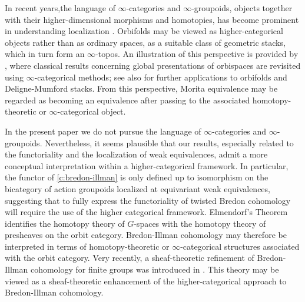 \documentclass[12pt,reqno]{amsart}
\theoremstyle{plain}
\theoremstyle{definition}
\begin{document}
In recent years,the language of $\infty$-categories and $\infty$-groupoids, objects together with their higher-dimensional morphisms and homotopies, has become prominent  in understanding localization \cite{lurie}.  Orbifolds may be  viewed as higher-categorical objects rather than as ordinary spaces, as a suitable class of geometric stacks, which in turn form an $\infty$-topos.     An illustration of this perspective is provided by \cite{dai}, where classical results concerning global presentations of orbispaces are revisited using $\infty$-categorical methods;  see also \cite{carchedi} for further applications to orbifolds and Deligne-Mumford stacks.
From this perspective, Morita equivalence may be regarded as becoming an equivalence after passing to the associated homotopy-theoretic or $\infty$-categorical object.  



In the present paper we do not pursue the language of $\infty$-categories and $\infty$-groupoids.  Nevertheless, it seems plausible that our results, especially related to the functoriality and the localization of weak equivalences, admit a more conceptual interpretation within a higher-categorical framework. In particular, the functor of \cref{c:bredon-illman} is only defined up to isomorphism on the bicategory of action groupoids localized at equivariant weak equivalences, suggesting that to fully express the functoriality of twisted Bredon cohomology will require the use of the higher categorical framework.
Elmendorf’s Theorem \cite{elmendorf} identifies the homotopy theory of $G$-spaces with
the homotopy theory of presheaves on the orbit category.   Bredon-Illman
cohomology may therefore be interpreted in terms of homotopy-theoretic or $\infty$-categorical
structures associated with the orbit category. Very recently, a sheaf-theoretic
refinement of Bredon-Illman cohomology for finite groups was introduced in \cite{ArMuNi}. This theory may be viewed as a sheaf-theoretic enhancement of the higher-categorical approach to
Bredon-Illman cohomology.
\end{document}
